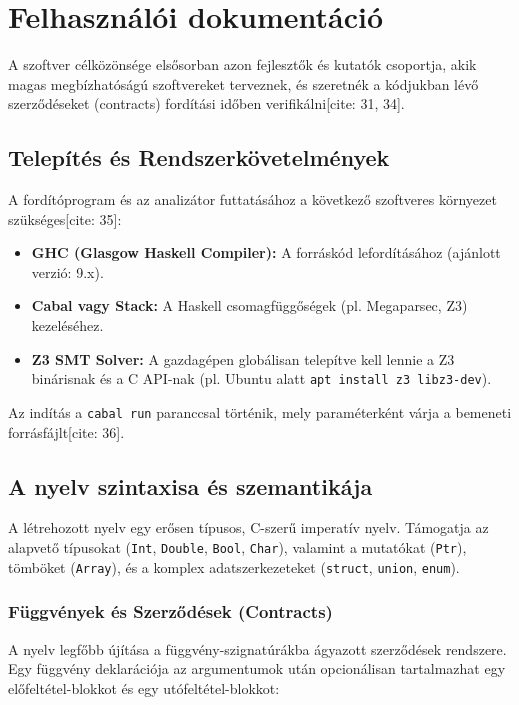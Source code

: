 \documentclass[
    hungarian,
    parspace
]{elteikthesis}
\begin{document}
\chapter{Felhasználói dokumentáció}
A szoftver célközönsége elsősorban azon fejlesztők és kutatók csoportja, akik magas megbízhatóságú szoftvereket terveznek, és szeretnék a kódjukban lévő szerződéseket (contracts) fordítási időben verifikálni[cite: 31, 34].

\section{Telepítés és Rendszerkövetelmények}
A fordítóprogram és az analizátor futtatásához a következő szoftveres környezet szükséges[cite: 35]:
\begin{itemize}
    \item \textbf{GHC (Glasgow Haskell Compiler):} A forráskód lefordításához (ajánlott verzió: 9.x).
    \item \textbf{Cabal vagy Stack:} A Haskell csomagfüggőségek (pl. Megaparsec, Z3) kezeléséhez.
    \item \textbf{Z3 SMT Solver:} A gazdagépen globálisan telepítve kell lennie a Z3 binárisnak és a C API-nak (pl. Ubuntu alatt \texttt{apt install z3 libz3-dev}).
\end{itemize}

Az indítás a \texttt{cabal run} paranccsal történik, mely paraméterként várja a bemeneti forrásfájlt[cite: 36].

\section{A nyelv szintaxisa és szemantikája}
A létrehozott nyelv egy erősen típusos, C-szerű imperatív nyelv. Támogatja az alapvető típusokat (\texttt{Int}, \texttt{Double}, \texttt{Bool}, \texttt{Char}), valamint a mutatókat (\texttt{Ptr}), tömböket (\texttt{Array}), és a komplex adatszerkezeteket (\texttt{struct}, \texttt{union}, \texttt{enum}).

\subsection{Függvények és Szerződések (Contracts)}
A nyelv legfőbb újítása a függvény-szignatúrákba ágyazott szerződések rendszere. Egy függvény deklarációja az argumentumok után opcionálisan tartalmazhat egy előfeltétel-blokkot és egy utófeltétel-blokkot:
\end{document}
